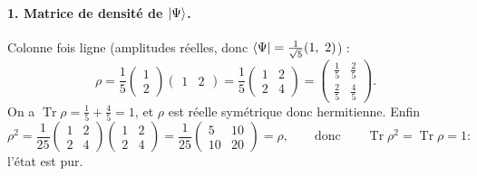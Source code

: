 \begin{correction}
\paragraph{1. Matrice de densité de $|\Psi\rangle$.} Colonne fois ligne (amplitudes réelles, donc
$\langle \Psi|=\frac{1}{\sqrt5}(1,\ 2)$) :
\[
  \rho=\frac15\begin{pmatrix}1\\2\end{pmatrix}\begin{pmatrix}1&2\end{pmatrix}
  =\frac15\begin{pmatrix}1&2\\2&4\end{pmatrix}
  =\begin{pmatrix}\frac15&\frac25\\[0.4ex]\frac25&\frac45\end{pmatrix}.
\]
On a $\operatorname{Tr}\rho=\frac15+\frac45=1$, et $\rho$ est réelle symétrique donc hermitienne. Enfin
\[
  \rho^2=\frac1{25}\begin{pmatrix}1&2\\2&4\end{pmatrix}\begin{pmatrix}1&2\\2&4\end{pmatrix}
  =\frac1{25}\begin{pmatrix}5&10\\10&20\end{pmatrix}=\rho,
  \qquad\text{donc}\qquad\operatorname{Tr}\rho^2=\operatorname{Tr}\rho=1:
\]
l'état est pur.


\end{correction}

